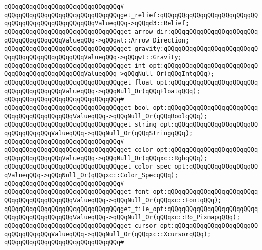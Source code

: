 \verb|qQQqqQQqqQQqqQQqqQQqqQQqqQQqqQQq#|\newline
\verb|qQQqqQQqqQQqqQQqqQQqqQQqqQQqqQQqget_relief:qQQqqQQqqQQqqQQqqQQqqQQqqQQqqQQqqQQqqQQqqQQqqQQqqQQqValueqQQq->qQQqd3::Relief;|\newline
\verb|qQQqqQQqqQQqqQQqqQQqqQQqqQQqqQQqget_arrow_dir:qQQqqQQqqQQqqQQqqQQqqQQqqQQqqQQqqQQqqQQqValueqQQq->qQQqwt::Arrow_Direction;|\newline
\verb|qQQqqQQqqQQqqQQqqQQqqQQqqQQqqQQqget_gravity:qQQqqQQqqQQqqQQqqQQqqQQqqQQqqQQqqQQqqQQqqQQqqQQqValueqQQq->qQQqwt::Gravity;|\newline
\newline
\verb|qQQqqQQqqQQqqQQqqQQqqQQqqQQqqQQqget_int_opt:qQQqqQQqqQQqqQQqqQQqqQQqqQQqqQQqqQQqqQQqqQQqqQQqValueqQQq->qQQqNull_Or(qQQqIntqQQq);|\newline
\verb|qQQqqQQqqQQqqQQqqQQqqQQqqQQqqQQqget_float_opt:qQQqqQQqqQQqqQQqqQQqqQQqqQQqqQQqqQQqqQQqValueqQQq->qQQqNull_Or(qQQqFloatqQQq);|\newline
\verb|qQQqqQQqqQQqqQQqqQQqqQQqqQQqqQQq#|\newline
\verb|qQQqqQQqqQQqqQQqqQQqqQQqqQQqqQQqget_bool_opt:qQQqqQQqqQQqqQQqqQQqqQQqqQQqqQQqqQQqqQQqqQQqValueqQQq->qQQqNull_Or(qQQqBoolqQQq);|\newline
\verb|qQQqqQQqqQQqqQQqqQQqqQQqqQQqqQQqget_string_opt:qQQqqQQqqQQqqQQqqQQqqQQqqQQqqQQqqQQqValueqQQq->qQQqNull_Or(qQQqStringqQQq);|\newline
\verb|qQQqqQQqqQQqqQQqqQQqqQQqqQQqqQQq#|\newline
\verb|qQQqqQQqqQQqqQQqqQQqqQQqqQQqqQQqget_color_opt:qQQqqQQqqQQqqQQqqQQqqQQqqQQqqQQqqQQqqQQqValueqQQq->qQQqNull_Or(qQQqxc::RgbqQQq);|\newline
\verb|qQQqqQQqqQQqqQQqqQQqqQQqqQQqqQQqget_color_spec_opt:qQQqqQQqqQQqqQQqqQQqValueqQQq->qQQqNull_Or(qQQqxc::Color_SpecqQQq);|\newline
\verb|qQQqqQQqqQQqqQQqqQQqqQQqqQQqqQQq#|\newline
\verb|qQQqqQQqqQQqqQQqqQQqqQQqqQQqqQQqget_font_opt:qQQqqQQqqQQqqQQqqQQqqQQqqQQqqQQqqQQqqQQqqQQqValueqQQq->qQQqNull_Or(qQQqxc::FontqQQq);|\newline
\verb|qQQqqQQqqQQqqQQqqQQqqQQqqQQqqQQqget_tile_opt:qQQqqQQqqQQqqQQqqQQqqQQqqQQqqQQqqQQqqQQqqQQqValueqQQq->qQQqNull_Or(qQQqxc::Ro_PixmapqQQq);|\newline
\verb|qQQqqQQqqQQqqQQqqQQqqQQqqQQqqQQqget_cursor_opt:qQQqqQQqqQQqqQQqqQQqqQQqqQQqqQQqqQQqValueqQQq->qQQqNull_Or(qQQqxc::XcursorqQQq);|\newline
\verb|qQQqqQQqqQQqqQQqqQQqqQQqqQQqqQQq#|\newline
